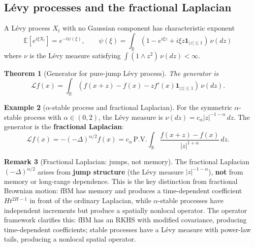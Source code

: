 \documentclass[11pt]{article}
\newtheorem{theorem}{Theorem}[section]
\theoremstyle{definition}
\newtheorem{example}[theorem]{Example}
\newtheorem{remark}[theorem]{Remark}
\newcommand{\E}{\mathbb{E}}
\newcommand{\R}{\mathbb{R}}
\begin{document}
\subsection{L\'evy processes and the fractional Laplacian}

A L\'evy process $X_t$ with no Gaussian component has characteristic exponent
\begin{equation}
\E[e^{i\xi X_t}] = e^{-t\psi(\xi)}, \qquad \psi(\xi) = \int_{\R} (1 - e^{i\xi z} + i\xi z \mathbf{1}_{|z| \leq 1}) \, \nu(dz)
\end{equation}
where $\nu$ is the L\'evy measure satisfying $\int (1 \wedge z^2) \, \nu(dz) < \infty$.

\begin{theorem}[Generator for pure-jump L\'evy process]\label{thm:levy-generator}
The generator is
\begin{equation}
\mathcal{L} f(x) = \int_{\R} (f(x+z) - f(x) - z f'(x) \mathbf{1}_{|z| \leq 1}) \, \nu(dz).
\end{equation}
\end{theorem}

\begin{example}[$\alpha$-stable process and fractional Laplacian]\label{ex:stable}
For the symmetric $\alpha$-stable process with $\alpha \in (0,2)$, the L\'evy measure is $\nu(dz) = c_\alpha |z|^{-1-\alpha} \, dz$. The generator is the \textbf{fractional Laplacian}:
\begin{equation}
\mathcal{L} f(x) = -(-\Delta)^{\alpha/2} f(x) = c_\alpha \, \text{P.V.} \int_{\R} \frac{f(x+z) - f(x)}{|z|^{1+\alpha}} \, dz.
\end{equation}
\end{example}

\begin{remark}[Fractional Laplacian: jumps, not memory]
The fractional Laplacian $(-\Delta)^{\alpha/2}$ arises from \textbf{jump structure} (the L\'evy measure $|z|^{-1-\alpha}$), \textbf{not} from memory or long-range dependence. This is the key distinction from fractional Brownian motion: fBM has memory and produces a time-dependent coefficient $Ht^{2H-1}$ in front of the ordinary Laplacian, while $\alpha$-stable processes have independent increments but produce a spatially nonlocal operator. The operator framework clarifies this: fBM has an RKHS with modified covariance, producing time-dependent coefficients; stable processes have a L\'evy measure with power-law tails, producing a nonlocal spatial operator.
\end{remark}
\end{document}
